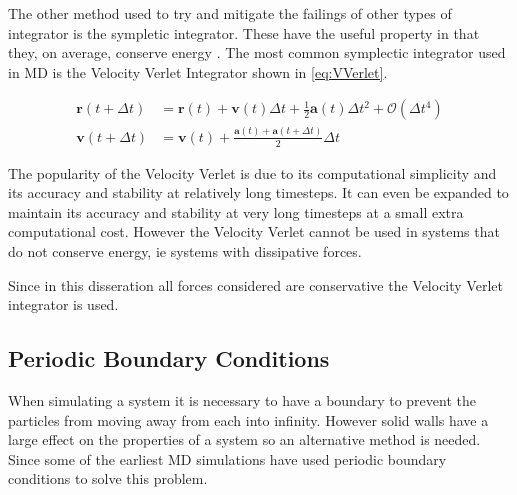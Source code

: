 \message{ !name(main.tex)}\documentclass[12pt]{UoAthesis}
\begin{document}
The other method used to try and mitigate the failings of other types
of integrator is the sympletic integrator.  These have the useful
property in that they, on average, conserve energy
\cite{Hairer2003}. The most common symplectic integrator used in MD is
the Velocity Verlet Integrator \cite{Swope1982} shown in
\eqref{eq:VVerlet}.

\begin{subequations}
\label{eq:VVerlet}
\begin{align}
 \mathbf{r}(t + \Delta t) &= \mathbf{r}(t) + \mathbf{v}(t) \Delta t 
 + \frac{1}{2}\mathbf{a}(t) \Delta t^2 + \mathcal{O}(\Delta t^4)
 \label{eq:VVerletpos} \\
 \mathbf{v}(t+\Delta t) &= \mathbf{v}(t) + \frac{\mathbf{a}(t) 
   + \mathbf{a}(t+\Delta t)}{2}\Delta t
 \label{eq:VVerletVel}
\end{align}
\end{subequations}

The popularity of the Velocity Verlet is due to its computational
simplicity and its accuracy and stability at relatively long
timesteps. It can even be expanded\cite{Khakimov2002} to maintain its
accuracy and stability at very long timesteps at a small extra
computational cost. However the Velocity Verlet cannot be used in
systems that do not conserve energy, ie systems with dissipative
forces.

Since in this disseration all forces considered are conservative the
Velocity Verlet integrator is used.

\subsection{Periodic Boundary Conditions}

When simulating a system it is necessary to have a boundary to prevent
the particles from moving away from each into infinity.  However solid
walls have a large effect on the properties of a system so an
alternative method is needed.  Since some of the earliest MD
simulations \cite{Alder1959} have used periodic boundary conditions to
solve this problem.  
\end{document}
